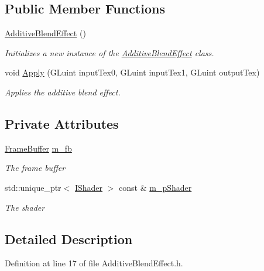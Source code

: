 \subsection*{Public Member Functions}
\begin{DoxyCompactItemize}
\item 
\hyperlink{class_additive_blend_effect_ac66ffc77617ad66c5bc5cf9811906c66}{Additive\+Blend\+Effect} ()
\begin{DoxyCompactList}\small\item\em Initializes a new instance of the \hyperlink{class_additive_blend_effect}{Additive\+Blend\+Effect} class. \end{DoxyCompactList}\item 
void \hyperlink{class_additive_blend_effect_a9e75b87d6e8bf28acc4f5d31c3049453}{Apply} (G\+Luint input\+Tex0, G\+Luint input\+Tex1, G\+Luint output\+Tex)
\begin{DoxyCompactList}\small\item\em Applies the additive blend effect. \end{DoxyCompactList}\end{DoxyCompactItemize}
\subsection*{Private Attributes}
\begin{DoxyCompactItemize}
\item 
\hyperlink{class_frame_buffer}{Frame\+Buffer} \hyperlink{class_additive_blend_effect_aa047c3ebbd318f3faee9dc17b63680e7}{m\+\_\+fb}
\begin{DoxyCompactList}\small\item\em The frame buffer \end{DoxyCompactList}\item 
std\+::unique\+\_\+ptr$<$ \hyperlink{class_i_shader}{I\+Shader} $>$ const \& \hyperlink{class_additive_blend_effect_a5f25db987222e0f6cefb14116da373e9}{m\+\_\+p\+Shader}
\begin{DoxyCompactList}\small\item\em The shader \end{DoxyCompactList}\end{DoxyCompactItemize}


\subsection{Detailed Description}


Definition at line 17 of file Additive\+Blend\+Effect.\+h.



